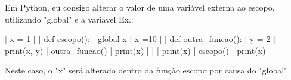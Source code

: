 Em Python, eu consigo alterar o valor de uma variável
externa ao escopo, utilizando "global" e a variável
Ex.:

|    x = 1
| 
|    def escopo():
|        global x
|        x =10
|
|        def outra_funcao():
|            y = 2
|            print(x, y)
|        outra_funcao()
|        print(x)
|
|
|    print(x)
|    escopo()
|    print(x)

Neste caso, o "x" será alterado dentro da função escopo
por causa do "global"